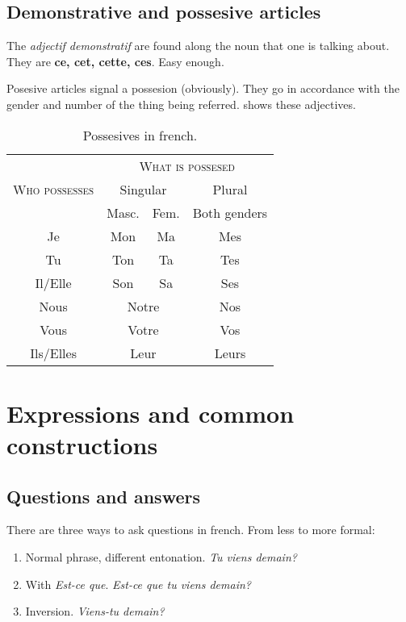 \documentclass[palatino]{nicenotes}
\begin{document}
\subsection{Demonstrative and possesive articles}

The \textit{adjectif demonstratif} are found along the noun that one is talking about. They are \textbf{ce, cet, cette, ces}. Easy enough.

Posesive articles signal a possesion (obviously). They go in accordance with the gender and number of the thing being referred.  shows these adjectives.

\begin{table}[hbtp]
\centering
\begin{tabular}{c|cc|c}
 & \multicolumn{3}{c}{\textsc{What is possesed}} \\
\textsc{Who possesses}	& \multicolumn{2}{c}{Singular} & Plural \\
	& Masc. & Fem. & Both genders \\ \midrule
Je & Mon & Ma & Mes \\
Tu & Ton & Ta & Tes \\
Il/Elle & Son & Sa & Ses \\
Nous & \multicolumn{2}{c|}{Notre} & Nos \\
Vous & \multicolumn{2}{c|}{Votre} & Vos \\
Ils/Elles & \multicolumn{2}{c|}{Leur} & Leurs \\
\end{tabular}
\caption{Possesives in french.}
\label{tab:Possesives}
\end{table}

\section{Expressions and common constructions}

\subsection{Questions and answers}

There are three ways to ask questions in french. From less to more formal:

\begin{enumerate}
\item Normal phrase, different entonation. \textit{Tu viens demain?}
\item With \textit{Est-ce que}. \textit{Est-ce que tu viens demain?}
\item Inversion. \textit{Viens-tu demain?}
\end{enumerate}
\end{document}
